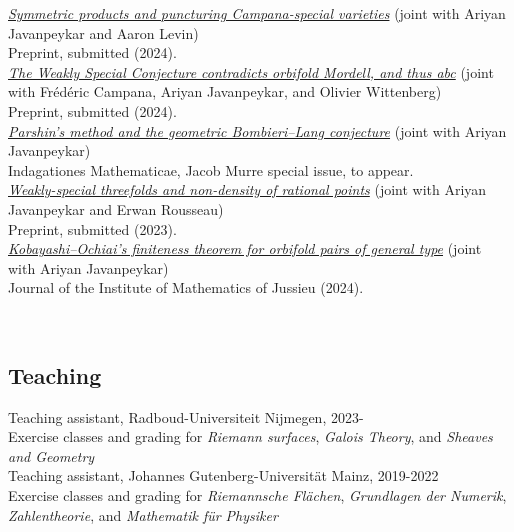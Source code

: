 \documentclass[paper=a4,fontsize=10pt,DIV=10,BCOR=3mm,pdftex]{scrartcl}
\begin{document}
\href{https://arxiv.org/abs/2412.14931}{\textit{Symmetric products and puncturing Campana-special varieties}} (joint with Ariyan Javanpeykar and Aaron Levin) \\
Preprint, submitted (2024). \\

\href{https://arxiv.org/abs/2410.06643}{\textit{The Weakly Special Conjecture contradicts orbifold Mordell, and thus abc}} (joint with Frédéric Campana, Ariyan Javanpeykar, and Olivier Wittenberg) \\
Preprint, submitted (2024). \\

\href{https://doi.org/10.1016/j.indag.2024.10.005}{\textit{Parshin's method and the geometric Bombieri--Lang conjecture}} (joint with Ariyan Javanpeykar) \\
Indagationes Mathematicae, Jacob Murre special issue, to appear. \\

\href{https://arxiv.org/abs/2310.09065}{\textit{Weakly-special threefolds and non-density of rational points}} (joint with Ariyan Javanpeykar and Erwan Rousseau) \\
Preprint, submitted (2023). \\

\href{https://doi.org/10.1017/S1474748024000094}{\textit{Kobayashi--Ochiai's finiteness theorem for orbifold pairs of general type}} (joint with Ariyan Javanpeykar) \\
Journal of the Institute of Mathematics of Jussieu (2024).

~\par


\subsection*{Teaching}
Teaching assistant, Radboud-Universiteit Nijmegen, 2023- \\
Exercise classes and grading for \textit{Riemann surfaces}, \textit{Galois Theory}, and \textit{Sheaves and Geometry} \\

Teaching assistant, Johannes Gutenberg-Universität Mainz, 2019-2022 \\
Exercise classes and grading for \textit{Riemannsche Flächen}, \textit{Grundlagen der Numerik}, \textit{Zahlentheorie}, and \textit{Mathematik für Physiker} \medskip \par


~\par
\end{document}
